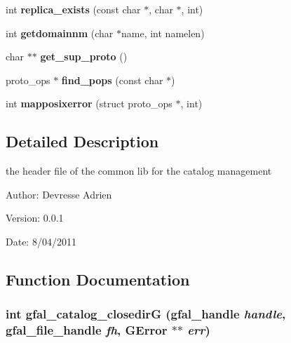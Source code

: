 \begin{CompactItemize}
\item 
int \textbf{replica\_\-exists} (const char $\ast$, char $\ast$, int)\label{gfal__common__catalog_8h_ac34379d44fb4037af134b34a9aae030}

\item 
int \textbf{getdomainnm} (char $\ast$name, int namelen)\label{gfal__common__catalog_8h_446a829e4f333d3a0364ab0f2b5a2dc7}

\item 
char $\ast$$\ast$ \textbf{get\_\-sup\_\-proto} ()\label{gfal__common__catalog_8h_03347619db3b30ef54ae6a98e351e21f}

\item 
proto\_\-ops $\ast$ \textbf{find\_\-pops} (const char $\ast$)\label{gfal__common__catalog_8h_40d4c392e45e16062bc90caf0ebfa436}

\item 
int \textbf{mapposixerror} (struct proto\_\-ops $\ast$, int)\label{gfal__common__catalog_8h_c8360922877ec368815d412209e862a2}

\end{CompactItemize}


\subsection{Detailed Description}
the header file of the common lib for the catalog management 

\begin{Desc}
\item[Author:]Devresse Adrien \end{Desc}
\begin{Desc}
\item[Version:]0.0.1 \end{Desc}
\begin{Desc}
\item[Date:]8/04/2011 \end{Desc}


\subsection{Function Documentation}
\subsubsection{\setlength{\rightskip}{0pt plus 5cm}int gfal\_\-catalog\_\-closedir\-G (gfal\_\-handle {\em handle}, gfal\_\-file\_\-handle {\em fh}, GError $\ast$$\ast$ {\em err})}\label{gfal__common__catalog_8h_348fe15690faed2e2731d15eb6cc7856}


